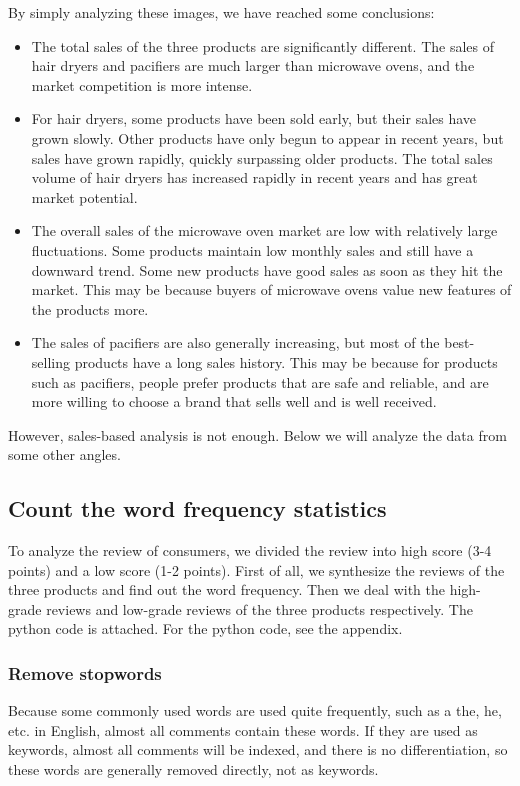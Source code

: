 \documentclass{mcmthesis}
\begin{document}
By simply analyzing these images, we have reached some conclusions:
\begin{itemize}
	\item
	The total sales of the three products are significantly different. The sales of hair dryers and pacifiers are much larger than microwave ovens, and the market competition is more intense.
	\item
	For hair dryers, some products have been sold early, but their sales have grown slowly. Other products have only begun to appear in recent years, but sales have grown rapidly, quickly surpassing older products. The total sales volume of hair dryers has increased rapidly in recent years and has great market potential.
	\item
	The overall sales of the microwave oven market are low with relatively large fluctuations. Some products maintain low monthly sales and still have a downward trend. Some new products have good sales as soon as they hit the market. This may be because buyers of microwave ovens value new features of the products more.
	\item
	The sales of pacifiers are also generally increasing, but most of the best-selling products have a long sales history. This may be because for products such as pacifiers, people prefer products that are safe and reliable, and are more willing to choose a brand that sells well and is well received.
\end{itemize}

However, sales-based analysis is not enough. Below we will analyze the data from some other angles.

\subsection{Count the word frequency statistics}
To analyze the review of consumers, we divided the review into high score (3-4 points) and a low score (1-2 points). First of all, we synthesize the reviews of the three products and find out the word frequency. Then we deal with the high-grade reviews and low-grade reviews of the three products respectively. The python code is attached. For the python code, see the appendix.
\subsubsection{Remove stopwords}
Because some commonly used words are used quite frequently, such as a the, he, etc. in English, almost all comments contain these words. If they are used as keywords, almost all comments will be indexed, and there is no differentiation, so these words are generally removed directly, not as keywords.
\end{document}
